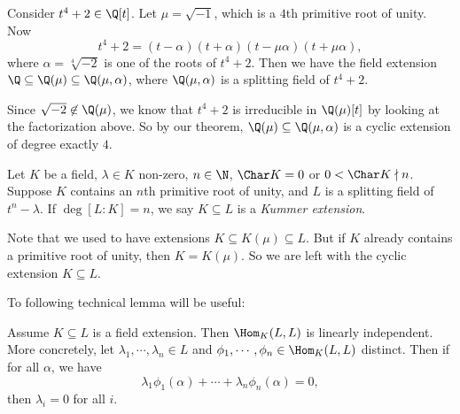 \documentclass[a4paper]{article}
\begin{document}
\begin{eg}
  Consider $t^4 + 2 \in \Q[t]$. Let $\mu = \sqrt{-1}$, which is a $4$th primitive root of unity. Now
  \[
    t^4 + 2 = (t - \alpha)(t + \alpha)(t - \mu \alpha)(t + \mu \alpha),
  \]
  where $\alpha = \sqrt[4]{-2}$ is one of the roots of $t^4 + 2$. Then we have the field extension $\Q \subseteq \Q(\mu) \subseteq \Q(\mu, \alpha)$, where $\Q(\mu, \alpha)$ is a splitting field of $t^4 + 2$.

  Since $\sqrt{-2} \not\in \Q(\mu)$, we know that $t^4 + 2$ is irreducible in $\Q(\mu)[t]$ by looking at the factorization above. So by our theorem, $\Q(\mu) \subseteq \Q(\mu, \alpha)$ is a cyclic extension of degree exactly $4$.
\end{eg}

\begin{defi}
  Let $K$ be a field, $\lambda \in K$ non-zero, $n \in \N$, $\Char K = 0$ or $0 < \Char K \nmid n$. Suppose $K$ contains an $n$th primitive root of unity, and $L$ is a splitting field of $t^n - \lambda$. If $\deg [L:K] = n$, we say $K\subseteq L$ is a \emph{Kummer extension}.
\end{defi}
Note that we used to have extensions $K\subseteq K(\mu) \subseteq L$. But if $K$ already contains a primitive root of unity, then $K = K(\mu)$. So we are left with the cyclic extension $K \subseteq L$.

To following technical lemma will be useful:
\begin{lemma}
  Assume $K\subseteq L$ is a field extension. Then $\Hom_K(L, L)$ is linearly independent. More concretely, let $\lambda_1, \cdots, \lambda_n \in L$ and $\phi_1, \cdots, \phi_n \in \Hom_K(L, L)$ distinct. Then if for all $\alpha$, we have
  \[
    \lambda_1 \phi_1(\alpha) + \cdots + \lambda_n \phi_n(\alpha) = 0,
  \]
  then $\lambda_i = 0$ for all $i$.
\end{lemma}
\end{document}

